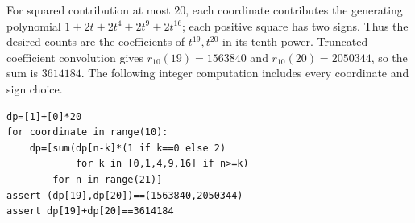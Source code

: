 For squared contribution at most $20$, each coordinate contributes the generating polynomial $1+2t+2t^4+2t^9+2t^{16}$; each positive square has two signs. Thus the desired counts are the coefficients of $t^{19},t^{20}$ in its tenth power. Truncated coefficient convolution gives $r_{10}(19)=1563840$ and $r_{10}(20)=2050344$, so the sum is $\boxed{3614184}$. The following integer computation includes every coordinate and sign choice.\begin{verbatim}
dp=[1]+[0]*20
for coordinate in range(10):
    dp=[sum(dp[n-k]*(1 if k==0 else 2)
            for k in [0,1,4,9,16] if n>=k)
        for n in range(21)]
assert (dp[19],dp[20])==(1563840,2050344)
assert dp[19]+dp[20]==3614184
\end{verbatim}
